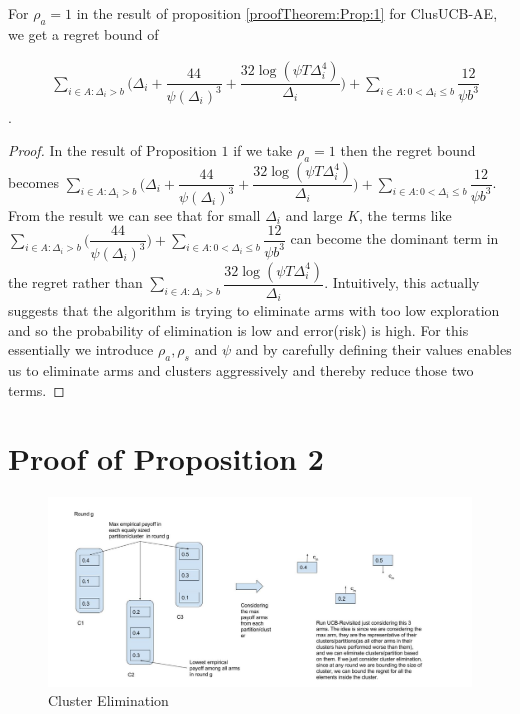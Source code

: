 
\begin{corollary}
\label{App:Proof:Corollary:3}
For $\rho_{a}=1$ in the result of proposition \ref{proofTheorem:Prop:1} for ClusUCB-AE, we get a regret bound of 

 \begin{align*}
 &\sum\limits_{i\in A:\Delta_{i} > b}\bigg(\Delta_{i} + \dfrac{44}{\psi(\Delta_{i})^{3}} + \dfrac{32\log{(\psi T\Delta_{i}^{4})}}{\Delta_{i}}\bigg) + \sum\limits_{i\in A:0< \Delta_{i}\leq b}\dfrac{12}{\psi b^{3}}
 \end{align*}.
\end{corollary}


\begin{proof}
In the result of Proposition $1$ if we take $\rho_{a}=1$ then the regret bound becomes $ \sum\limits_{i\in A:\Delta_{i} > b}\bigg(\Delta_{i} + \dfrac{44}{\psi(\Delta_{i})^{3}} + \dfrac{32\log{(\psi T\Delta_{i}^{4})}}{\Delta_{i}}\bigg) + \sum\limits_{i\in A:0< \Delta_{i}\leq b}\dfrac{12}{\psi b^{3}}$. From the result we can see that for small $\Delta_{i}$ and large $K$, the terms like $ \sum\limits_{i\in A:\Delta_{i} > b}\bigg(\dfrac{44}{\psi(\Delta_{i})^{3}}\bigg) + \sum\limits_{i\in A:0 < \Delta_{i}\leq b}\dfrac{12}{\psi b^{3}}$ can become the dominant term in the regret rather than $\sum\limits_{i\in A:\Delta_{i} > b}\dfrac{32\log{(\psi T\Delta_{i}^{4})}}{\Delta_{i}}$. Intuitively, this actually suggests that the algorithm is trying to eliminate arms with too low exploration and so the probability of elimination is low and error(risk) is high. For this essentially we introduce $\rho_{a},\rho_{s}$ and $\psi$ and by carefully defining their values enables us to eliminate arms and clusters aggressively and thereby reduce those two terms. 
\end{proof}

\section{Proof of Proposition 2}
\label{App:B}

\begin{figure}
\includegraphics[scale=0.3]{img/diagCluster.jpg}
\caption{Cluster Elimination}
\label{Fig:ClusFig}
\end{figure}


